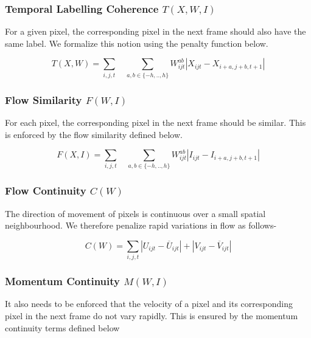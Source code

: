 \documentclass{article}
\begin{document}
\subsubsection*{Temporal Labelling Coherence $T(X,W,I)$}

For a given pixel, the corresponding pixel in the next frame should
also have the same label. We formalize this notion using the penalty
function below.

\begin{equation}
T(X,W)=\underset{i,j,t}{\sum}\quad\underset{a,b\in\{-h,..,h\}}{\sum}W_{ijt}^{ab}|X_{ijt}-X_{i+a,j+b,t+1}|
\end{equation}



\subsubsection*{Flow Similarity $F(W,I)$}

For each pixel, the corresponding pixel in the next frame should be
similar. This is enforced by the flow similarity defined below.

\begin{equation}
F(X,I)=\underset{i,j,t}{\sum}\quad\underset{a,b\in\{-h,..,h\}}{\sum}W_{ijt}^{ab}|I_{ijt}-I_{i+a,j+b,t+1}|
\end{equation}



\subsubsection*{Flow Continuity $C(W)$}

The direction of movement of pixels is continuous over a small spatial
neighbourhood. We therefore penalize rapid variations in flow as follows-

\begin{equation}
C(W)=\underset{i,j,t}{\sum}|U_{ijt}-\overline{U}_{ijt}|+|V_{ijt}-\overline{V}_{ijt}|
\end{equation}



\subsubsection*{Momentum Continuity $M(W,I)$}

It also needs to be enforced that the velocity of a pixel and its
corresponding pixel in the next frame do not vary rapidly. This is
ensured by the momentum continuity terms defined below
\end{document}
